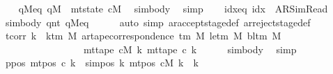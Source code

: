 \begin{isabellebody}
\ \ \isamarkupfalse%
\ qM{\isacharprime}{\kern0pt}{\isacharunderscore}{\kern0pt}eq{\isacharcolon}{\kern0pt}\ {\isachardoublequoteopen}qM{\isacharprime}{\kern0pt}\ {\isacharequal}{\kern0pt}\ mt{\isacharunderscore}{\kern0pt}state\ cM{\isachardoublequoteclose}\ \isamarkupfalse%
\ sim{\isacharunderscore}{\kern0pt}body\ \isamarkupfalse%
\ simp\isanewline
\ \ \isamarkupfalse%
\ idx{\isacharunderscore}{\kern0pt}eq{\isacharcolon}{\kern0pt}\ {\isachardoublequoteopen}idx\ {\isacharequal}{\kern0pt}\ AR{\isacharunderscore}{\kern0pt}SimRead{\isachardoublequoteclose}\isanewline
\ \ \ \ \isamarkupfalse%
\ sim{\isacharunderscore}{\kern0pt}body\ qnt\ qM{\isacharprime}{\kern0pt}{\isacharunderscore}{\kern0pt}eq\isanewline
\ \ \ \ \isamarkupfalse%
\ {\isacharparenleft}{\kern0pt}auto\ simp{\isacharcolon}{\kern0pt}\ ar{\isacharunderscore}{\kern0pt}accept{\isacharunderscore}{\kern0pt}stage{\isacharunderscore}{\kern0pt}def\ ar{\isacharunderscore}{\kern0pt}reject{\isacharunderscore}{\kern0pt}stage{\isacharunderscore}{\kern0pt}def{\isacharparenright}{\kern0pt}\isanewline
\ \ \isamarkupfalse%
\ tcorr{\isacharcolon}{\kern0pt}\ {\isachardoublequoteopen}{\isasymforall}k\ {\isacharless}{\kern0pt}\ k{\isacharunderscore}{\kern0pt}tm\ M{\isachardot}{\kern0pt}\ ar{\isacharunderscore}{\kern0pt}tape{\isacharunderscore}{\kern0pt}correspondence\ {\isacharparenleft}{\kern0pt}{\isasymGamma}{\isacharunderscore}{\kern0pt}tm\ M{\isacharparenright}{\kern0pt}\ {\isacharparenleft}{\kern0pt}le{\isacharunderscore}{\kern0pt}tm\ M{\isacharparenright}{\kern0pt}\ {\isacharparenleft}{\kern0pt}bl{\isacharunderscore}{\kern0pt}tm\ M{\isacharparenright}{\kern0pt}\isanewline
\ \ \ \ \ \ \ \ \ \ \ \ \ \ \ \ \ {\isacharparenleft}{\kern0pt}mt{\isacharunderscore}{\kern0pt}tape\ cM\ k{\isacharparenright}{\kern0pt}\ {\isacharparenleft}{\kern0pt}mt{\isacharunderscore}{\kern0pt}tape\ c{\isacharprime}{\kern0pt}\ k{\isacharparenright}{\kern0pt}{\isachardoublequoteclose}\isanewline
\ \ \ \ \isamarkupfalse%
\ sim{\isacharunderscore}{\kern0pt}body\ \isamarkupfalse%
\ simp\isanewline
\ \ \isamarkupfalse%
\ ppos{}{\isacharcolon}{\kern0pt}\ {\isachardoublequoteopen}mt{\isacharunderscore}{\kern0pt}pos\ c{\isacharprime}{\kern0pt}\ k\ {\isacharequal}{\kern0pt}\ sim{\isacharunderscore}{\kern0pt}pos\ {\isacharquery}{\kern0pt}k\ {\isacharparenleft}{\kern0pt}mt{\isacharunderscore}{\kern0pt}pos\ cM\ k{\isacharparenright}{\kern0pt}{\isachardoublequoteclose}\ \ k\isanewline

\end{isabellebody}
